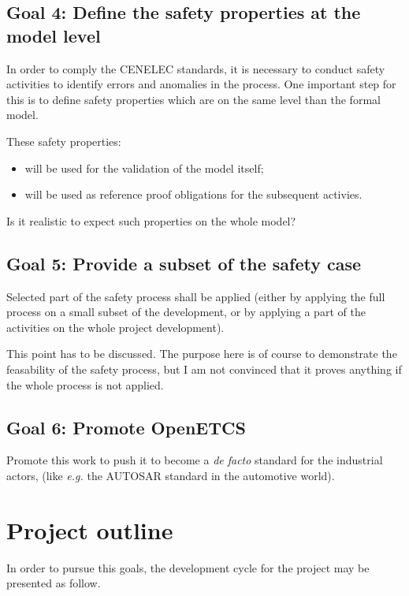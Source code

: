 \documentclass{template/openetcs_article}
\begin{document}
\subsection{Goal 4: Define the safety properties at the model level}
In order to comply the CENELEC standards, it is necessary to conduct safety activities 
to identify errors and anomalies in the process. One important step for this is to define safety 
properties which are on the same level than the formal model.

These safety properties:
\begin{itemize}
\item will be used for the validation of the model itself;
\item will be used as reference proof obligations for the subsequent activies.
\end{itemize}

\begin{issue}
Is it realistic to expect such properties on the whole model? 
\end{issue}

\subsection{Goal 5: Provide a subset of the safety case}
Selected part of the safety process shall be applied (either by applying the full process on a small
subset of the development, or by applying a part of the activities on the whole project development).

\begin{issue}
This point has to be discussed. The purpose here is of course to demonstrate the feasability 
of the safety process, but I am not convinced that it proves anything if the whole process is 
not applied.
\end{issue}

\subsection{Goal 6: Promote OpenETCS}
Promote this work to push it to become a \emph{de facto} standard for the industrial actors, 
(like \emph{e.g.} the AUTOSAR standard in the automotive world).

\section{Project outline}
In order to pursue this goals, the development cycle for the project may be presented as follow. 
\end{document}
